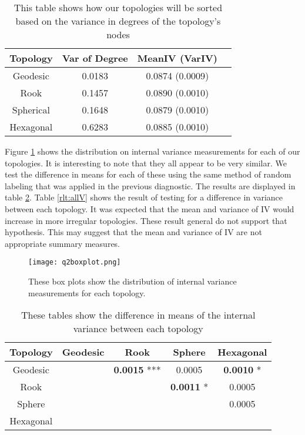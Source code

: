 \begin{table}[hbt]
\centering
\caption{This table shows how our topologies will be sorted based on the
variance in degrees of the topology's nodes}
\label{vardeg}
\begin{tabular}{|c|c|c|c|}
\hline
Topology & Var of Degree & MeanIV (VarIV)\\
\hline
Geodesic & 0.0183 & 0.0874 (0.0009)\\
Rook & 0.1457 & 0.0890 (0.0010)\\
Spherical & 0.1648 & 0.0879 (0.0010)\\
Hexagonal & 0.6283 & 0.0885 (0.0010)\\
\hline
\end{tabular}
\end{table}

Figure \ref{q2boxplot} shows the distribution on internal variance
measurements for each of our topologies.  It is interesting to note that
they all appear to be very similar. We test the difference in means for
each of these using the same method of random labeling that was applied in the
previous diagnostic. The results are displayed in table \ref{rlt:all}. Table
\ref{rlt:allV} shows the result of testing for a difference in variance
between each topology.  It was expected that the mean and variance of IV would
increase in more irregular topologies.  These result general do not support
that hypothesis. This may suggest that the mean and variance of IV are not
appropriate summary measures.

\begin{figure}[hbt]
\centering
\texttt{[image: q2boxplot.png]}
\caption{These box plots show the distribution of internal variance measurements
for each topology.}
\label{q2boxplot}
\end{figure}


\begin{table}[hbt]
  \centering
  \caption{These tables show the difference in means of the internal variance between each topology}
  \label{rlt:all}
  \begin{tabular}{|c||c|c|c|c|}
  \hline
  \textbf{Topology}&Geodesic &Rook	&Sphere			&Hexagonal		\\\hline
  \hline
  Geodesic	&& \textbf{0.0015} ***	& 0.0005		& \textbf{0.0010} *	\\\hline
  Rook		&& 			& \textbf{0.0011} *	& 0.0005		\\\hline
  Sphere	&& 			& 			& 0.0005 		\\\hline
  Hexagonal 	&& 			& 			&			\\\hline
  \end{tabular}
  \end{table}





